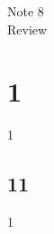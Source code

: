 \documentclass[12pt]{article}
\begin{document}
\normalfont
\pagestyle{pages}


\begin{center}
\vspace{3in}
{\Large Note 8 } \\[0.05in]
Review \\ [0.5in]
\end{center}


\section{1}
1

\subsection{11}

1
\end{document}
